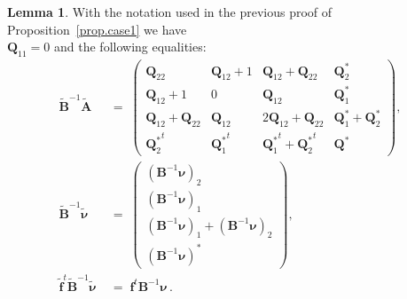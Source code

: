 \documentclass[12pt,reqno]{amsart}
\theoremstyle{definition}
\newtheorem{lemma}[theorem]{Lemma}
\def\mbfQ{\mathbf Q}
\renewcommand{\=}{\;=\;}
\begin{document}
\begin{lemma}
\label{lem.23.c1}
With the notation used in the previous proof of Proposition~\ref{prop.case1}
we have\\ $\mbfQ_{11}=0$ and the following equalities:
\begin{align}
\label{eq.c2.bia}
\widetilde {\mathbf B}^{-1} \widetilde {\mathbf A} &\=
\left(\!\!\begin{array}{ccc|c}
\mathbf Q_{22} & \mathbf Q_{12} + 1&
\mathbf Q_{12} + \mathbf Q_{22}& \mathbf Q_2^*\\
\mathbf Q_{12} + 1& 0&
\mathbf Q_{12}& \mathbf Q_1^*\\
\mathbf Q_{12} +\mathbf Q_{22}& \mathbf Q_{12}&
2\mathbf Q_{12} +\mathbf  Q_{22}& \mathbf Q_1^* + \mathbf Q_2^*\\
\hline
{\mathbf Q_2^*}^t& {\mathbf Q_1^*}^t&
{\mathbf Q_1^*}^t + {\mathbf Q_2^*}^t& \mathbf Q^*
\end{array}
\!\!\right),
\\\label{eq.c2.binu}
\widetilde {\mathbf B}^{-1}\widetilde{\boldsymbol{\nu}}
&\= \left(\!\!
\begin{array}{c}
(\mathbf B^{-1}\boldsymbol{\nu})_2\\
(\mathbf B^{-1}\boldsymbol{\nu})_1\\
(\mathbf B^{-1}\boldsymbol{\nu})_1 + (\mathbf B^{-1}\boldsymbol{\nu})_2\\
(\mathbf B^{-1}\boldsymbol{\nu})^*
\end{array}\!\!\right),
\\\label{eq.c3.ff}
\widetilde{\mathbf{f}}^{t}\widetilde {\mathbf B}^{-1}\widetilde{\boldsymbol{\nu}}
&\= \mathbf{f}^{t}\mathbf{B}^{-1}\boldsymbol{\nu}\,.
\end{align}
\end{lemma}
\end{document}
